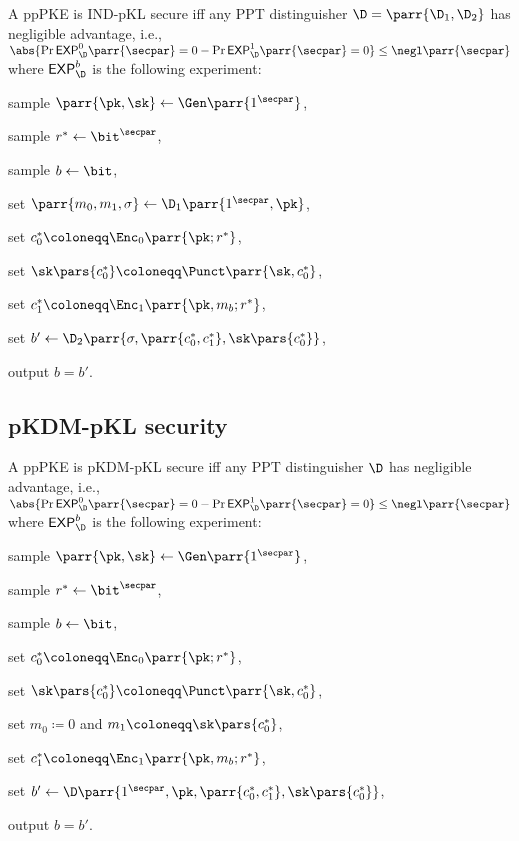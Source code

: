 \begin{definition}
    A ppPKE is IND-pKL secure iff any PPT distinguisher \(\D = \parr{\D_1,\D_2}\) has negligible advantage, i.e., \(\abs{\Pr{\mathsf{EXP}^0_\D\parr{\secpar} = 0} - \Pr{\mathsf{EXP}^1_\D\parr{\secpar} = 0}} \leq \negl\parr{\secpar}\) where \(\mathsf{EXP}^b_\D\) is the following experiment:
    \begin{sitemize}
        \item sample \(\parr{\pk,\sk} \gets \Gen\parr{1^\secpar}\),
        \item sample \(r^* \gets \bit^\secpar\),
        \item sample \(b \gets \bit\),
        \item set \(\parr{m_0,m_1,\sigma} \gets \D_1\parr{1^\secpar,\pk}\),
        \item set \(c_0^* \coloneqq \Enc_0\parr{\pk;r^*}\),
        \item set \(\sk\pars{c^*_0} \coloneqq \Punct\parr{\sk,c_0^*}\),
        \item set \(c_1^* \coloneqq \Enc_1\parr{\pk,m_b;r^*}\),
        \item set \(b' \gets \D_2\parr{\sigma,\parr{c^*_0,c^*_1},\sk\pars{c^*_0}}\),
        \item output \(b = b'\).
    \end{sitemize}
\end{definition}


\subsection{pKDM-pKL security}

\begin{definition}
    A ppPKE is pKDM-pKL secure iff any PPT distinguisher \(\D\) has negligible advantage, i.e., \(\abs{\Pr{\mathsf{EXP}^0_\D\parr{\secpar} = 0} - \Pr{\mathsf{EXP}^1_\D\parr{\secpar} = 0}} \leq \negl\parr{\secpar}\) where \(\mathsf{EXP}^b_\D\) is the following experiment:
    \begin{sitemize}
        \item sample \(\parr{\pk,\sk} \gets \Gen\parr{1^\secpar}\),
        \item sample \(r^* \gets \bit^\secpar\),
        \item sample \(b \gets \bit\),
        \item set \(c_0^* \coloneqq \Enc_0\parr{\pk;r^*}\),
        \item set \(\sk\pars{c^*_0} \coloneqq \Punct\parr{\sk,c_0^*}\),
        \item set \(m_0 \coloneqq 0\) and \(m_1 \coloneqq \sk\pars{c^*_0}\),
        \item set \(c_1^* \coloneqq \Enc_1\parr{\pk,m_b;r^*}\),
        \item set \(b' \gets \D\parr{1^\secpar,\pk,\parr{c^*_0,c^*_1},\sk\pars{c^*_0}}\),
        \item output \(b = b'\).
    \end{sitemize}
\end{definition}

